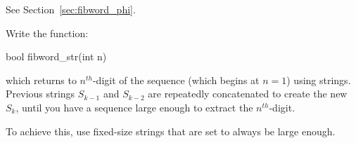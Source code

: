 

See Section~\ref{sec:fibword_phi}.

\begin{exercise}
Write the function:
\begin{codesnippet}
bool fibword_str(int n)
\end{codesnippet}
which returns to $n^{th}$-digit of the sequence (which begins at $n=1$)
using strings. Previous strings
$S_{k-1}$ and $S_{k-2}$
are repeatedly concatenated to create the new $S_k$, until you have a sequence
large enough to extract the $n^{th}$-digit. 

To achieve this, use fixed-size strings that are set to always be large enough.
\end{exercise}
